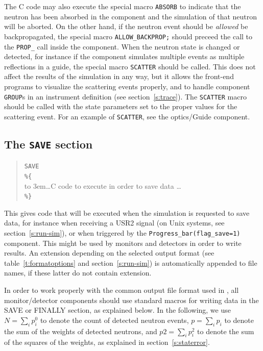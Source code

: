 The C code may also execute the special macro \texttt{ABSORB} to indicate
that the neutron has been absorbed in the component and the simulation of
that neutron will be aborted. On the other hand, if the neutron event
should be \emph{allowed} be backpropagated, the special macro
\verb+ALLOW_BACKPROP;+ should preceed the call to the \verb+PROP_+
call inside the component.
When the neutron state is changed or detected, for
instance if the component simulates multiple events as multiple
reflections in a guide, the
special macro \texttt{SCATTER} should be called. This does not affect the
results of the simulation in any way, but it allows the front-end
programs to visualize the scattering events properly, and to handle
component \texttt{GROUP}s in an instrument definition (see
section~\ref{s:trace}). The \texttt{SCATTER} macro should be called with
the state parameters set to the proper values for the scattering event.
For an example of \texttt{SCATTER}, see the optics/Guide
component. 


\subsection{The \texttt{SAVE} section}
\label{s:comp-save}

\begin{quote}
  \texttt{SAVE} \\
  \verb|%{| \\
  \hbox to 3em{}\ldots C code to execute in order to save data \ldots \\
  \verb|%}|
\end{quote}
This gives code that will be executed when the simulation is requested to save data, for instance when receiving a USR2 signal (on Unix systems, see section~\ref{s:run-sim}), or when triggered by the \texttt{Progress\_bar(flag\_save=1)} component.
This might be used by monitors and detectors in order to write results.
An extension depending on the selected output format (see table~\ref{t:formatoptions} and section~\ref{s:run-sim}) is automatically appended to file names, if these latter do not contain extension.

In order to work properly with the common output file format used in
\MCS, all monitor/detector components should use standard macros for
writing data in the SAVE or FINALLY section, as explained below. In the
following, we use $N = \sum_i p_i^0$ to denote the count of detected
neutron events, $p = \sum_i p_i$ to denote the sum of the weights of
detected neutrons, and $\textit{p2} = \sum_i p_i^2$ to denote the sum of
the squares of the weights, as explained in section~\ref{s:staterror}.

